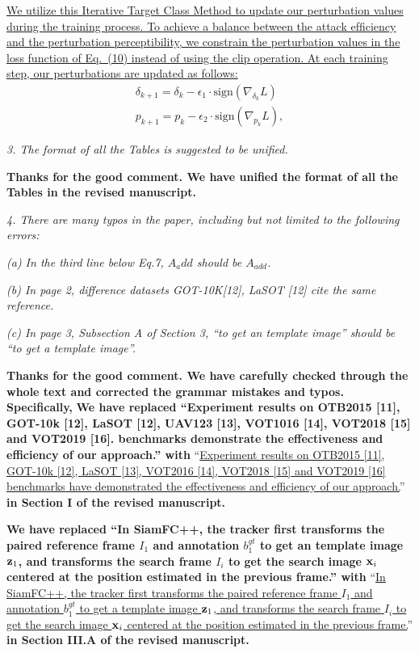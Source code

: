 \documentclass[12pt]{article}
\begin{document}
\uline{We utilize this Iterative Target Class Method to update our perturbation values during the training process. To achieve a balance between the attack efﬁciency and the perturbation perceptibility, we constrain the perturbation values in the loss function of Eq.~(10) instead of using the clip operation. At each training step, our perturbations are updated as follows:}
\begin{gather}
\delta_{k+1} = \delta_{k} - \epsilon_1 \cdot \text{sign}(\nabla_{\delta_k}L)\\
p_{k+1} = p_{k} - \epsilon_2 \cdot \text{sign}(\nabla_{p_k}L),
\end{gather}


\textit{3. The format of all the Tables is suggested to be unified.}

\textbf{Thanks for the good comment. We have unified the format of all the Tables in the revised manuscript.}

\textit{4. There are many typos in the paper, including but not limited to the following errors:}

\textit{(a) In the third line below Eq.7, $A_{a}dd$ should be $A_{add}$.}

\textit{(b) In page 2, difference datasets GOT-10K[12], LaSOT [12] cite the same reference.}

\textit{(c) In page 3, Subsection A of Section 3, “to get an template image” should be “to get a template image”.}

\textbf{Thanks for the good comment. We have carefully checked through the whole text and corrected the grammar mistakes and typos. Specifically,}
\textbf{We have replaced ``Experiment results on OTB2015 [11], GOT-10k [12], LaSOT [12], UAV123 [13], VOT1016 [14], VOT2018 [15] and VOT2019 [16]. benchmarks demonstrate the effectiveness and efficiency of our approach.'' with}
``\uline{Experiment results on OTB2015 [11], GOT-10k [12], LaSOT [13], VOT2016 [14], VOT2018 [15] and VOT2019 [16] benchmarks have demonstrated the effectiveness and efficiency of our approach.}''
\textbf{in Section I of the revised manuscript.}

\textbf{We have replaced ``In SiamFC++, the tracker first transforms the paired reference frame $I_1$ and annotation $b_1^{gt}$ to get an template image $\textbf z_1$, and transforms the search frame $I_i$ to get the search image $\textbf x_i$ centered at the position estimated in the previous frame.'' with}
``\uline{In SiamFC++, the tracker first transforms the paired reference frame $I_1$ and annotation $b_1^{gt}$ to get a template image $\textbf z_1$, and transforms the search frame $I_i$ to get the search image $\textbf x_i$ centered at the position estimated in the previous frame.}''
\textbf{in Section III.A of the revised manuscript.}
\end{document}
